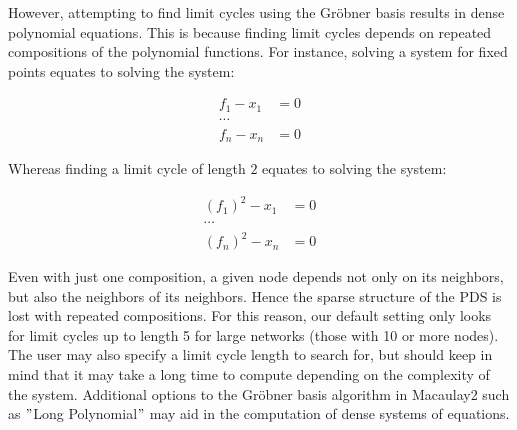 \documentclass[11pt]{amsart}
\begin{document}
However, attempting to find limit cycles using the Gr\"obner basis results in dense polynomial equations. This is because finding limit cycles depends on repeated compositions of the polynomial functions.
For instance, solving a system for fixed points equates to solving the system:
\begin{center} \begin{align} f_1-x_1 &=0 \\ \cdots \\ f_n-x_n &=0 \end{align} \end{center}
Whereas finding a limit cycle of length $2$ equates to solving the system:
\begin{center}
  \begin{align}
    (f_1)^2 - x_1 &=0 \\ \cdots \\ (f_n)^2 - x_n &=0
  \end{align}
\end{center}
Even with just one composition, a given node depends not only on its neighbors, but also the neighbors of its neighbors.  Hence the sparse structure of the PDS is lost with repeated compositions. For this reason, our default setting only looks for limit cycles up to length 5 for large networks (those with 10 or more nodes).  The user may also specify a limit cycle length to search for, but should keep in mind that it may take a long time to compute depending on the complexity of the system.  Additional options to the Gr\"obner basis algorithm in Macaulay2 such as $"$Long Polynomial$"$ may aid in the computation of dense systems of equations.
\end{document}

